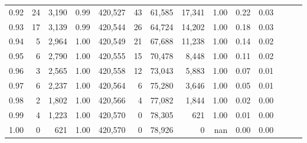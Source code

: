 \begin{tabular}{rrrrrrrrrrrrrr}
0.92 &     24 &  3,190 &  0.99 &  420,527 &       43 &  61,585 &  17,341 &  1.00 &  0.22 &      0.03 \\
0.93 &     17 &  3,139 &  0.99 &  420,544 &       26 &  64,724 &  14,202 &  1.00 &  0.18 &      0.03 \\
0.94 &      5 &  2,964 &  1.00 &  420,549 &       21 &  67,688 &  11,238 &  1.00 &  0.14 &      0.02 \\
0.95 &      6 &  2,790 &  1.00 &  420,555 &       15 &  70,478 &   8,448 &  1.00 &  0.11 &      0.02 \\
0.96 &      3 &  2,565 &  1.00 &  420,558 &       12 &  73,043 &   5,883 &  1.00 &  0.07 &      0.01 \\
0.97 &      6 &  2,237 &  1.00 &  420,564 &        6 &  75,280 &   3,646 &  1.00 &  0.05 &      0.01 \\
0.98 &      2 &  1,802 &  1.00 &  420,566 &        4 &  77,082 &   1,844 &  1.00 &  0.02 &      0.00 \\
0.99 &      4 &  1,223 &  1.00 &  420,570 &        0 &  78,305 &     621 &  1.00 &  0.01 &      0.00 \\
1.00 &      0 &    621 &  1.00 &  420,570 &        0 &  78,926 &       0 &   nan &  0.00 &      0.00 \\
\bottomrule
\end{tabular}

